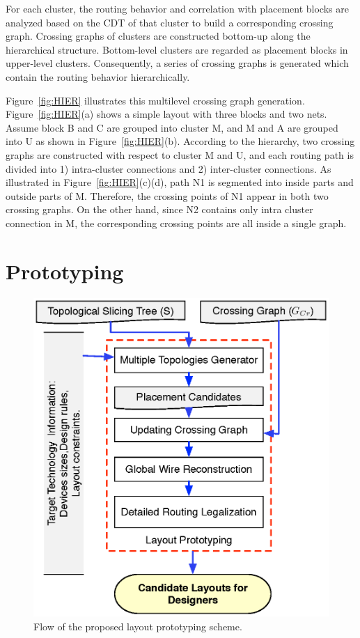       For each cluster, the routing behavior and correlation with placement blocks are analyzed based on the CDT of that cluster to build a corresponding crossing graph. 
      Crossing graphs of clusters are constructed bottom-up along the hierarchical structure. 
      Bottom-level clusters are regarded as placement blocks in upper-level clusters. 
      Consequently, a series of crossing graphs is generated which contain the routing behavior hierarchically.

      Figure~\ref{fig:HIER} illustrates this multilevel crossing graph generation.
      Figure~\ref{fig:HIER}(a) shows a simple layout with three blocks and two nets.
      Assume block B and C are grouped into cluster M, and M and A are grouped into U as shown in Figure~\ref{fig:HIER}(b).
      According to the hierarchy, two crossing graphs are constructed with respect to cluster M and U, and
      each routing path is divided into 1) intra-cluster connections and 2) inter-cluster connections. 
      As illustrated in Figure~\ref{fig:HIER}(c)(d), path N1 is segmented into inside parts and outside parts of M. 
      Therefore, the crossing points of N1 appear in both two crossing graphs. 
      On the other hand, since N2 contains only intra cluster connection in M, the corresponding crossing points are all inside a single graph.

  \section{Prototyping}\label{sec:Proto}

    \begin{figure}[t]
      \centering
      \includegraphics[height=0.7\textwidth]{Fig/Chapter4/Proto_Flow.eps}
      \caption{Flow of the proposed layout prototyping scheme.} 
      \label{fig:Proto_Flow}
    \end{figure}

